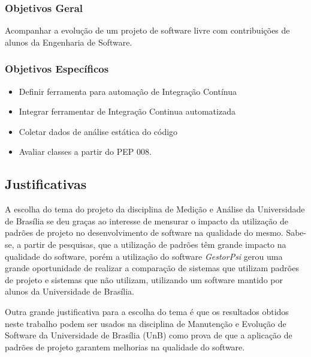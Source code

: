 \subsubsection{Objetivos Geral}

Acompanhar a evolução de um projeto de software livre com contribuições de alunos
da Engenharia de Software.

\subsubsection{Objetivos Específicos}
\begin{itemize}
	\item Definir ferramenta para automação de Integração Contínua
	\item Integrar ferramentar de Integração Continua automatizada
	\item Coletar dados de análise estática do código
	\item Avaliar classes a partir do PEP 008.
\end{itemize}


\subsection{Justificativas} %
\label{sub:justificativas}

A escolha do tema do projeto da disciplina de Medição e Análise da Universidade de Brasília se deu graças ao interesse de mensurar o impacto da utilização de padrões de projeto no desenvolvimento de software na qualidade do mesmo. Sabe-se, a partir de pesquisas, que a utilização de padrões têm grande impacto na qualidade do software, porém a utilização do software \textit{GestorPsi} gerou uma grande oportunidade de realizar a comparação de sistemas que utilizam padrões de projeto e sistemas que não utilizam, utilizando um software mantido por alunos da Universidade de Brasília.

Outra grande justificativa para a escolha do tema é que os resultados obtidos neste trabalho podem ser usados na disciplina de Manutenção e Evolução de Software da Universidade de Brasília (UnB) como prova de que a aplicação de padrões de projeto garantem melhorias na qualidade do software.

